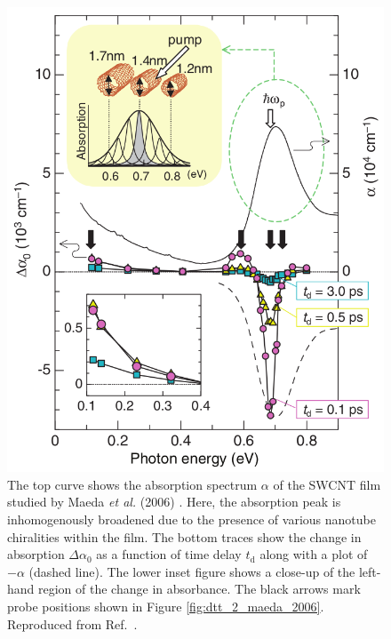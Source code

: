 \begin{figure}[H]
	\centering
	\includegraphics[scale=0.3]{images/chapter_prior_works/stark_shift_maeda}
	\caption{The top curve shows the absorption spectrum $\alpha$ of the SWCNT film studied by Maeda \textit{et al.} (2006) \cite{maeda2006gigantic}. Here, the absorption peak is inhomogenously broadened due to the presence of various nanotube chiralities within the film. The bottom traces show the change in absorption $\Delta \alpha_0$ as a function of time delay $t_\text{d}$ along with a plot of $-\alpha$ (dashed line). The lower inset figure shows a close-up of the left-hand region of the change in absorbance. The black arrows mark probe positions shown in Figure \ref{fig:dtt_2_maeda_2006}. Reproduced from Ref.\ \cite{maeda2006gigantic}.}
	\label{fig:abs_maeda_2006}
\end{figure}


